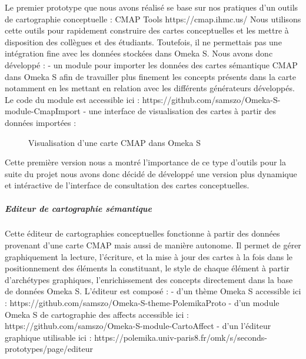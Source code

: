 \documentclass[
  a4paper,
  DIV=11,
  numbers=noendperiod]{scrreprt}
\let\oldsubparagraph\subparagraph
\renewcommand{\subparagraph}[1]{\oldsubparagraph{#1}\mbox{}}
\begin{document}
Le premier prototype que nous avons réalisé se base sur nos pratiques
d'un outils de cartographie conceptuelle : CMAP Tools
https://cmap.ihmc.us/ Nous utilisons cette outils pour rapidement
construire des cartes conceptuelles et les mettre à disposition des
collègues et des étudiants. Toutefois, il ne permettais pas une
intégration fine avec les données stockées dans Omeka S. Nous avons donc
développé : - un module pour importer les données des cartes sémantique
CMAP dans Omeka S afin de travailler plus finement les concepts présents
dans la carte notamment en les mettant en relation avec les différents
générateurs développés. Le code du module est accessible ici :
https://github.com/samszo/Omeka-S-module-CmapImport - une interface de
visualisation des cartes à partir des données importées :

\begin{figure}


\caption{\label{fig-polemikaCMAP}Visualisation d'une carte CMAP dans
Omeka S}

\end{figure}%

Cette première version nous a montré l'importance de ce type d'outils
pour la suite du projet nous avons donc décidé de développé une version
plus dynamique et intéractive de l'interface de consultation des cartes
conceptuelles.

\subparagraph{Editeur de cartographie
sémantique}\label{editeur-de-cartographie-suxe9mantique}

Cette éditeur de cartographies conceptuelles fonctionne à partir des
données provenant d'une carte CMAP mais aussi de manière autonome. Il
permet de gérer graphiquement la lecture, l'écriture, et la mise à jour
des cartes à la fois dans le positionnement des éléments la constituant,
le style de chaque élément à partir d'archétypes graphiques,
l'enrichissement des concepts directement dans la base de données Omeka
S. L'éditeur est composé : - d'un thème Omeka S accessible ici :
https://github.com/samszo/Omeka-S-theme-PolemikaProto - d'un module
Omeka S de cartographie des affects accessible ici :
https://github.com/samszo/Omeka-S-module-CartoAffect - d'un l'éditeur
graphique utilisable ici :
https://polemika.univ-paris8.fr/omk/s/seconds-prototypes/page/editeur
\end{document}
